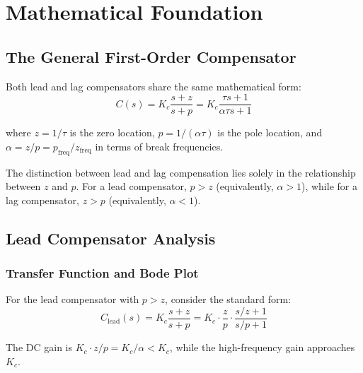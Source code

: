 \section{Mathematical Foundation}
\label{sec:lead_lag_math}

\subsection{The General First-Order Compensator}

Both lead and lag compensators share the same mathematical form:
\begin{equation}
\boxed{C(s) = K_c \frac{s + z}{s + p} = K_c \frac{\tau s + 1}{\alpha \tau s + 1}}
\label{eq:general_compensator}
\end{equation}

where $z = 1/\tau$ is the zero location, $p = 1/(\alpha\tau)$ is the pole location, and $\alpha = z/p = p_{\text{freq}}/z_{\text{freq}}$ in terms of break frequencies.

The distinction between lead and lag compensation lies solely in the relationship between $z$ and $p$. For a lead compensator, $p > z$ (equivalently, $\alpha > 1$), while for a lag compensator, $z > p$ (equivalently, $\alpha < 1$).

\subsection{Lead Compensator Analysis}

\subsubsection{Transfer Function and Bode Plot}

For the lead compensator with $p > z$, consider the standard form:
\begin{equation}
C_{\text{lead}}(s) = K_c \frac{s + z}{s + p} = K_c \cdot \frac{z}{p} \cdot \frac{s/z + 1}{s/p + 1}
\label{eq:lead_standard}
\end{equation}

The DC gain is $K_c \cdot z/p = K_c/\alpha < K_c$, while the high-frequency gain approaches $K_c$.

